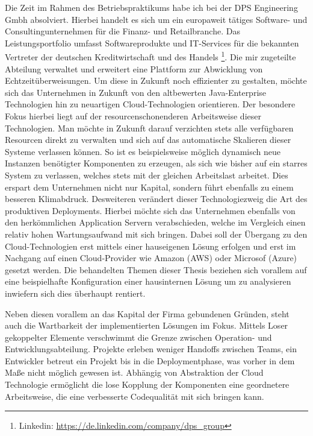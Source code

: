 Die Zeit im Rahmen des Betriebspraktikums habe ich bei der DPS Engineering Gmbh absolviert. Hierbei handelt es sich um ein europaweit tätiges Software- und Consultingunternehmen für die Finanz- und Retailbranche. Das Leistungsportfolio umfasst Softwareprodukte und IT-Services für die bekannten Vertreter der deutschen Kreditwirtschaft und des Handels \footnote{Linkedin: \url{https://de.linkedin.com/company/dps_group}}. Die mir zugeteilte Abteilung verwaltet und erweitert eine Plattform zur Abwicklung von Echtzeitüberweisungen. Um diese in Zukunft noch effizienter zu gestalten, möchte sich das Unternehmen in Zukunft von den altbewerten Java-Enterprise Technologien hin zu neuartigen Cloud-Technologien orientieren. Der besondere Fokus hierbei liegt auf der resourcenschonenderen Arbeitsweise dieser Technologien. Man möchte in Zukunft darauf verzichten stets alle verfügbaren Resourcen direkt zu verwalten und sich auf das automatische Skalieren dieser Systeme verlassen können. So ist es beispielsweise möglich dynamisch neue Instanzen benötigter Komponenten zu erzeugen, als sich wie bisher auf ein starres System zu verlassen, welches stets mit der gleichen Arbeitslast arbeitet. Dies erspart dem Unternehmen nicht nur Kapital, sondern führt ebenfalls zu einem besseren Klimabdruck. Desweiteren verändert dieser Technologiezweig die Art des produktiven Deployments. Hierbei möchte sich das Unternehmen ebenfalls von den herkömmlichen Application Servern verabschieden, welche im Vergleich einen relativ hohen Wartungsaufwand mit sich bringen. Dabei soll der Übergang zu den Cloud-Technologien erst mittels einer hauseigenen Lösung erfolgen und erst im Nachgang auf einen Cloud-Provider wie Amazon (AWS) oder Microsof (Azure) gesetzt werden. Die behandelten Themen dieser Thesis beziehen sich vorallem auf eine beispielhafte Konfiguration einer hausinternen Lösung um zu analysieren inwiefern sich dies überhaupt rentiert. 

Neben diesen vorallem an das Kapital der Firma gebundenen Gründen, steht auch die Wartbarkeit der implementierten Lösungen im Fokus. Mittels Loser gekoppelter Elemente verschwimmt die Grenze zwischen Operation- und Entwicklungsabteilung. Projekte erleben weniger Handoffs zwischen Teams, ein Entwickler betreut ein Projekt bis in die Deploymentphase, was vorher in dem Maße nicht möglich gewesen ist. Abhängig von Abstraktion der Cloud Technologie ermöglicht die lose Kopplung der Komponenten eine geordnetere Arbeitsweise, die eine verbesserte Codequalität mit sich bringen kann. 

